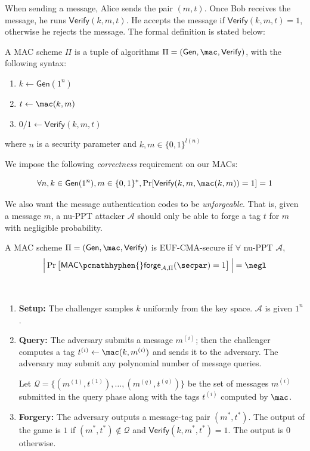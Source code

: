 \documentclass[12pt]{tufte-book}
\newcommand{\ma}{\mathcal{A}}
\newcommand{\cA}{\mathcal{A}}
\newcommand{\gen}{\mathsf{Gen}}
\newcommand{\Verify}{\mathsf{Verify}}
\begin{document}
When sending a message, Alice sends the pair $(m, t)$.
Once Bob receives the message, he runs $\Verify(k, m, t)$.
He accepts the message if $\Verify(k, m, t) = 1$, otherwise he rejects the message.
The formal definition is stated below:
\begin{definition}
    A MAC scheme $\Pi$ is a tuple of algorithms $\Pi = (\gen, \mac, \Verify)$, with the following syntax:
    \begin{enumerate}
        \item $k \leftarrow \gen(1^n)$
        \item $t \leftarrow \mac(k,m)$
        \item $0/1 \leftarrow \Verify(k, m, t)$
    \end{enumerate}
    where $n$ is a security parameter and $k, m \in \{0, 1\}^{l(n)}$
\end{definition}

We impose the following \textit{correctness} requirement on our MACs:
\begin{definition}
    $$\forall n, k \in \gen(1^n), m \in \{0, 1\}^*, \Pr[\Verify(k, m, \mac(k, m)) = 1] = 1$$
\end{definition}

We also want the message authentication codes to be \textit{unforgeable}.
That is, given a message $m$, a nu-PPT attacker $\ma$ should only be able to forge a tag $t$ for $m$ with negligible probability.
\begin{definition}
    A MAC scheme $\Pi = (\gen,\mac,\Verify)$ is EUF-CMA-secure if $\forall$ nu-PPT $\ma$,
    $$\Big| \Pr\left[\mathsf{MAC}\pcmathhyphen{}\mathsf{forge}_{\cA, \Pi}(\secpar) =1\right]\Big| = \negl$$
\end{definition}

\begin{definition}[$\mathsf{MAC}\pcmathhyphen{}\mathsf{forge}_{\cA, \Pi}(\secpar)$]
$ $
   \begin{enumerate}
        \item \textbf{Setup:} The challenger samples $k$ uniformly from the key space. $\cA$ is given $1^n$.
        \item \textbf{Query:} The adversary submits a message $m^{(i)}$; then the challenger computes a tag $t^{(i)} \gets \mac(k, m^{(i)})$ and sends it to the adversary. The adversary may submit any polynomial number of message queries.

        Let $\mathcal{Q} = \{(m^{(1)}, t^{(1)}), \dots, (m^{(q)}, t^{(q)})\}$ be the set of messages $m^{(i)}$ submitted in the query phase along with the tags $t^{(i)}$ computed by $\mac$.
        \item \textbf{Forgery:} The adversary outputs a message-tag pair $(m^*, t^*)$. The output of the game is $1$ if $(m^*,t^*) \notin \mathcal{Q}$ and $\Verify(k, m^*, t^*) = 1$. The output is $0$ otherwise.
    \end{enumerate}
\end{definition}
\end{document}
